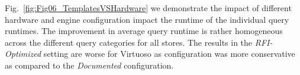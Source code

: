 
Fig.~\ref{fig:Fig06_TemplatesVSHardware} we demonstrate the impact of different hardware and engine configuration impact the runtime of the individual query runtimes. The improvement in average query runtime is rather homogeneous across the different query categories for all stores. The results in the \emph{RFI-Optimized} setting are worse for Virtuoso as configuration was more conservative as compared to the \emph{Documented} configuration.
